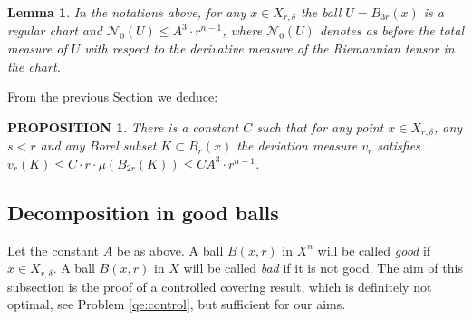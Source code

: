 \documentclass[12pt,leqno,intlimits]{amsart}
\numberwithin{equation}{section}
\newtheorem{lem}[thm]{Lemma}
\newtheorem{prop}[thm]{PROPOSITION}
\theoremstyle{definition}
\theoremstyle{remark}
\def\RR{\mathbb R}
\def\eps{\varepsilon}
\begin{document}
\begin{lem}
In the notations above, for any $x\in X_{r,\delta}$  the ball $U=B_{3r} (x)$ is a regular chart and
 $\mathcal N_0 (U) \leq A^3 \cdot r^{n-1}$, where $\mathcal N_0 (U)$ denotes as before the total measure of $U$ with respect to the derivative measure of the Riemannian tensor in the chart.\end{lem}








From the previous Section we deduce:


 \begin{prop}  \label{ballmeasure}
 There is a constant $C$ such that for any point $x\in X_{r,\delta}$, any $s<r$ and any
 Borel subset $K\subset B_r (x)$ the deviation measure $v_r $ satisfies
  $v_r (K) \leq C \cdot r\cdot \mu  ( B_{2r} (K)) \leq CA^3 \cdot r^{n-1} $.
 \end{prop}





\subsection{Decomposition in good balls}
Let the constant  $A$ be as above.
A ball $B(x,r)$ in $X^n$ will be called \emph{good} if $x\in X_{r,\delta}$.
%
A ball $B(x,r)$ in $X$ will be called \emph{bad} if it is not good.
The aim of this subsection is the proof of a controlled covering result, which is definitely not optimal, see Problem \ref{qe:control}, but sufficient for our
aims.
\end{document}
